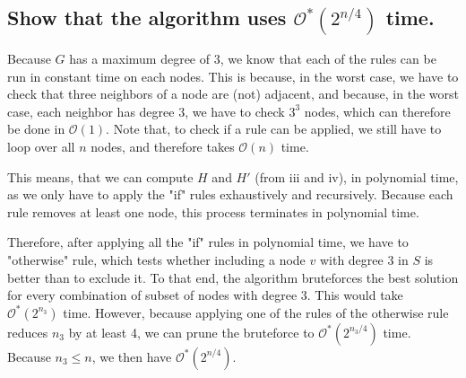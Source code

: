 \documentclass{article}
\begin{document}
\subsection{
    \textbf{Show that the algorithm uses $\mathcal{O}^*(2^{n/4})$ time.}
}

Because $G$ has a maximum degree of 3, we know that each of the rules can be run in constant time on each nodes. This is because, in the worst case, we have to check that three neighbors of a node are (not) adjacent, and because, in the worst case, each neighbor has degree 3, we have to check $3^3$ nodes, which can therefore be done in $\mathcal{O}(1)$. Note that, to check if a rule can be applied, we still have to loop over all $n$ nodes, and therefore takes $\mathcal{O}(n)$ time.

This means, that we can compute $H$ and $H'$ (from iii and iv), in polynomial time, as we only have to apply the "if" rules exhaustively and recursively. Because each rule removes at least one node, this process terminates in polynomial time.

Therefore, after applying all the "if" rules in polynomial time, we have to "otherwise" rule, which tests whether including a node $v$ with degree 3 in $S$ is better than to exclude it. To that end, the algorithm bruteforces the best solution for every combination of subset of nodes with degree 3. This would take $\mathcal{O}^*(2^{n_3})$ time. However, because applying one of the rules of the otherwise rule reduces $n_3$ by at least 4, we can prune the bruteforce to $\mathcal{O}^*(2^{n_3/4})$ time.
% 
Because $n_3 \leq n$, we then have $\mathcal{O}^*(2^{n/4})$.
\end{document}
